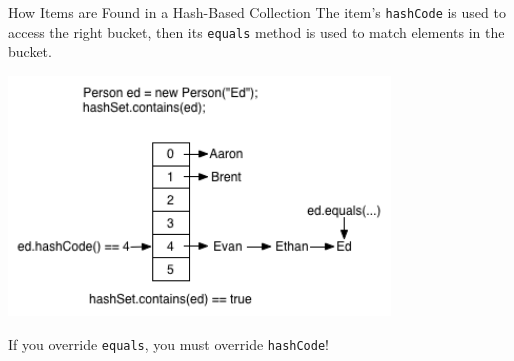 \documentclass{beamer}
\begin{document}
\begin{frame}[fragile]{How Items are Found in a Hash-Based Collection}
\vspace{-.1in}
The item's {\tt hashCode} is used to access the right bucket, then its {\tt equals} method is used to match elements in the bucket.
\vspace{-.1in}
\begin{center}
\includegraphics[height=2.5in]{hashtable-find.png}
\end{center}
\vspace{-.1in}
If you override {\tt equals}, you must override {\tt hashCode}!
\end{frame}
\end{document}
